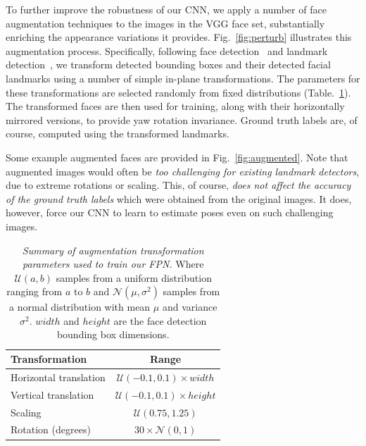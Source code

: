 \documentclass[10pt,twocolumn,letterpaper]{article}
\begin{document}
To further improve the robustness of our CNN, we apply a number of face augmentation techniques to the images in the VGG face set, substantially enriching the appearance variations it provides. Fig.~\ref{fig:perturb} illustrates this augmentation process. Specifically, following face detection~\cite{yang2016multi} and landmark detection~\cite{baltruvsaitis2016openface}, we transform detected bounding boxes and their detected facial landmarks using a number of simple in-plane transformations. The parameters for these transformations are selected randomly from fixed distributions (Table.~\ref{tab:perturb_dist}). The transformed faces are then used for training, along with their horizontally mirrored versions, to provide yaw rotation invariance. Ground truth labels are, of course, computed using the transformed landmarks. 

Some example augmented faces are provided in Fig.~\ref{fig:augmented}. Note that augmented images would often be {\em too challenging for existing landmark detectors}, due to extreme rotations or scaling. This, of course, {\em does not affect the accuracy of the ground truth labels} which were obtained from the original images. It does, however, force our CNN to learn to estimate poses even on such challenging images. 


\begin{table}[t]
\caption{{\em Summary of augmentation transformation parameters used to train our FPN.} Where $\mathcal{U}(a,b)$ samples from a uniform distribution ranging from $a$ to $b$ and $\mathcal{N}(\mu,\sigma^2)$ samples from a  normal distribution with mean $\mu$ and variance $\sigma^2$. $width$ and $height$ are the face detection bounding box dimensions.}
\label{tab:perturb_dist}
\begin{center}
\begin{tabular}{lc}
\toprule
\textbf{Transformation} & \textbf{Range}\\ \hline
Horizontal translation & $\mathcal{U}(-0.1,0.1) \times width$ \\
Vertical translation & $\mathcal{U}(-0.1,0.1) \times height$ \\
Scaling & $\mathcal{U}(0.75,1.25)$ \\
Rotation (degrees)& $30\times \mathcal{N}(0,1)$ \\
\bottomrule
\end{tabular}
\end{center}
\end{table}
\end{document}
